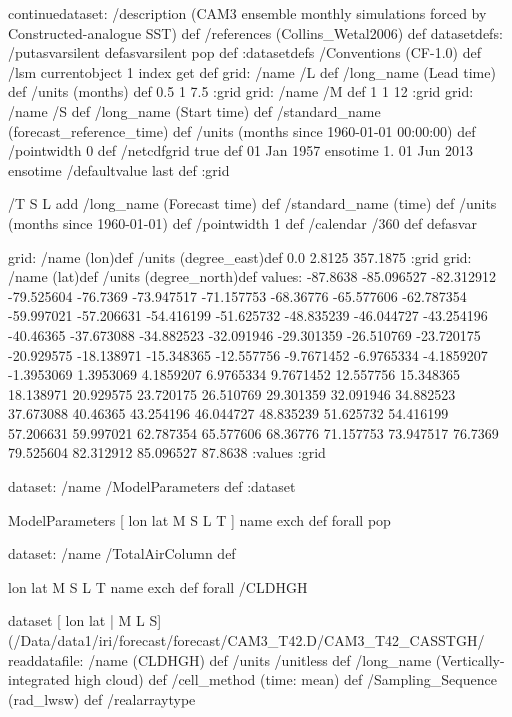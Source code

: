 

\begin{ingrid}
continuedataset:
/description (CAM3 ensemble monthly simulations forced by Constructed-analogue SST) def
/references (Collins_Wetal2006) def
datasetdefs:
/putasvarsilent { defasvarsilent pop } def
:datasetdefs
/Conventions (CF-1.0) def
/lsm currentobject 1 index get def
grid:
/name /L def
/long_name (Lead time) def
/units (months) def
0.5 1 7.5
:grid
grid:
/name /M def
1 1 12
:grid
grid:
/name /S def
/long_name (Start time) def
/standard_name (forecast_reference_time) def
/units (months since 1960-01-01 00:00:00) def
/pointwidth 0 def 
/netcdfgrid true def
01 Jan 1957 ensotime
1.
01 Jun 2013 ensotime
/defaultvalue {last} def
:grid


/T { 
S L add
/long_name (Forecast time) def
/standard_name (time) def
/units (months since 1960-01-01) def
/pointwidth 1 def
/calendar /360 def
 }defasvar



grid:
/name (lon)def
/units (degree_east)def
 0.0 2.8125 357.1875
:grid
grid:
/name (lat)def
/units (degree_north)def
values: -87.8638 -85.096527 -82.312912 -79.525604 -76.7369 -73.947517 -71.157753 -68.36776 -65.577606 -62.787354 -59.997021 -57.206631 -54.416199 -51.625732 -48.835239 -46.044727 -43.254196 -40.46365 -37.673088 -34.882523 -32.091946 -29.301359 -26.510769 -23.720175 -20.929575 -18.138971 -15.348365 -12.557756 -9.7671452 -6.9765334 -4.1859207 -1.3953069 1.3953069 4.1859207 6.9765334 9.7671452 12.557756 15.348365 18.138971 20.929575 23.720175 26.510769 29.301359 32.091946 34.882523 37.673088 40.46365 43.254196 46.044727 48.835239 51.625732 54.416199 57.206631 59.997021 62.787354 65.577606 68.36776 71.157753 73.947517 76.7369 79.525604 82.312912 85.096527 87.8638 :values
:grid


dataset: /name /ModelParameters def :dataset

ModelParameters  [ lon lat M S L T ] { name exch def } forall pop

dataset: /name /TotalAirColumn def

 { lon lat M S L T } { name exch def } forall 
 /CLDHGH {
dataset
[ lon lat | M L S] 
(/Data/data1/iri/forecast/forecast/CAM3_T42.D/CAM3_T42_CASSTGH/%
readdatafile:
/name (CLDHGH) def
/units /unitless def
/long_name (Vertically-integrated high cloud) def
/cell_method (time: mean) def
/Sampling_Sequence (rad_lwsw) def
/realarraytype 

}
\end{ingrid}
